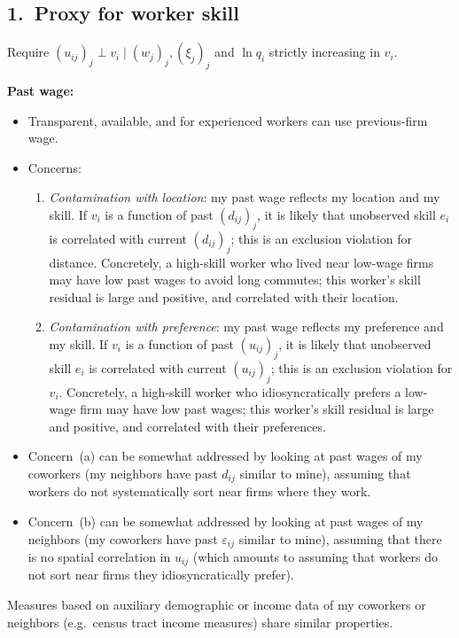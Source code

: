 \documentclass[11pt]{article}
\begin{document}
\subsection*{1.\ Proxy for worker skill}

Require $(u_{ij})_j \perp v_i \mid (w_j)_j, (\xi_j)_j$ and $\ln q_i$ strictly increasing in $v_i$.

\medskip\noindent\textbf{Past wage:}
\begin{itemize}[nosep]
    \item Transparent, available, and for experienced workers can use previous-firm wage.
    \item Concerns:
    \begin{enumerate}[nosep,label=\alph*.]
        \item \emph{Contamination with location}: my past wage reflects my location and my skill. If $v_i$ is a function of past $(d_{ij})_j$, it is likely that unobserved skill $e_i$ is correlated with current $(d_{ij})_j$; this is an exclusion violation for distance. Concretely, a high-skill worker who lived near low-wage firms may have low past wages to avoid long commutes; this worker's skill residual is large and positive, and correlated with their location.
        \item \emph{Contamination with preference}: my past wage reflects my preference and my skill. If $v_i$ is a function of past $(u_{ij})_j$, it is likely that unobserved skill $e_i$ is correlated with current $(u_{ij})_j$; this is an exclusion violation for $v_i$. Concretely, a high-skill worker who idiosyncratically prefers a low-wage firm may have low past wages; this worker's skill residual is large and positive, and correlated with their preferences.
    \end{enumerate}
    \item Concern~(a) can be somewhat addressed by looking at past wages of my coworkers (my neighbors have past $d_{ij}$ similar to mine), assuming that workers do not systematically sort near firms where they work.
    \item Concern~(b) can be somewhat addressed by looking at past wages of my neighbors (my coworkers have past $\varepsilon_{ij}$ similar to mine), assuming that there is no spatial correlation in $u_{ij}$ (which amounts to assuming that workers do not sort near firms they idiosyncratically prefer).
\end{itemize}
Measures based on auxiliary demographic or income data of my coworkers or neighbors (e.g.\ census tract income measures) share similar properties.
\end{document}
